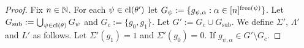 \documentclass[../paper.tex]{subfiles}
\begin{document}
\begin{proof}


  Fix $n \in \mathbb{N}$. For each $\psi \in \mathrm{cl}(\theta')$ let $G_\psi := \{g_{\psi,
    \alpha} : \alpha \in [n]^{\mathrm{free}(\psi)} \}$. Let $G_{\text{sub}} :=
  \bigcup_{\psi \in \mathrm{cl}(\theta)} G_{\psi}$ and $G_c := \{g_0, g_1\}$. Let $G' := G_c \cup
    G_{\text{sub}}$. We define $\Sigma'$, $\Lambda'$ and $L'$ as follows. Let
    $\Sigma' (g_1) = 1$ and $\Sigma' (g_0) = 0$. If $g_{\psi, \alpha} \in G'
    \setminus G_c$.


\end{proof}
\end{document}
